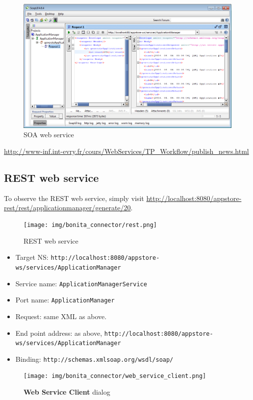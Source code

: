 \documentclass[]{report}
\let\Oldincludegraphics\includegraphics
\renewcommand{\includegraphics}[1]{
\begin{adjustbox}{max size={\textwidth}{\textheight}}
    \Oldincludegraphics[scale=0.6]{#1}%
\end{adjustbox}
}
\begin{document}
\begin{figure}[htbp]
\centering
\includegraphics{img/bonita_connector/soapui.png}
\caption{SOA web service}
\end{figure}

\url{http://www-inf.int-evry.fr/cours/WebServices/TP_Workflow/publish_news.html}

\subsection{REST web service}

To observe the REST web service, simply visit
\url{http://localhost:8080/appstore-rest/rest/applicationmanager/generate/20}.

\begin{figure}[htbp]
\centering
\texttt{[image: img/bonita\_connector/rest.png]}
\caption{REST web service}
\end{figure}

\begin{itemize}
\itemsep1pt\parskip0pt
\item
  Target NS:
  \texttt{http://localhost:8080/appstore-ws/services/ApplicationManager}
\item
  Service name: \texttt{ApplicationManagerService}
\item
  Port name: \texttt{ApplicationManager}
\item
  Request: same XML as above.
\item
  End point address: as above,
  \texttt{http://localhost:8080/appstore-ws/services/ApplicationManager}
\item
  Binding: \texttt{http://schemas.xmlsoap.org/wsdl/soap/}
\end{itemize}

\begin{figure}[htbp]
\centering
\texttt{[image: img/bonita\_connector/web\_service\_client.png]}
\caption{\textbf{Web Service Client} dialog}
\end{figure}
\end{document}
